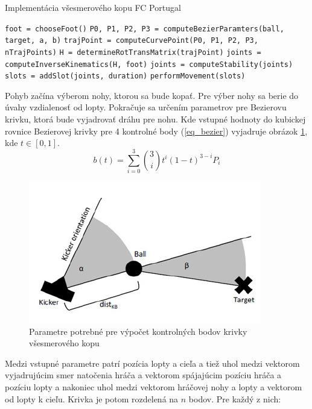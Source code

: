 \begin{algorithm}
	\caption{Implementácia všesmerového kopu FC Portugal}\label{} 
	\begin{algorithmic}
		\STATE \texttt{foot = chooseFoot()}
		\STATE \texttt{P0, P1, P2, P3 = computeBezierParamters(ball, target, a, b)}
			\STATE \texttt{trajPoint = computeCurvePoint(P0, P1, P2, P3, nTrajPoints)}
			\STATE \texttt{H = determineRotTransMatrix(trajPoint)}
			\STATE \texttt{joints = computeInverseKinematics(H, foot)}
			\STATE \texttt{joints = computeStability(joints)}
			\STATE \texttt{slots = addSlot(joints, duration)}
		\ENDFOR
		\STATE \texttt{performMovement(slots)}
	\end{algorithmic}
\end{algorithm}

Pohyb začína výberom nohy, ktorou sa bude kopať. Pre výber nohy sa berie do úvahy vzdialenosť od lopty. Pokračuje sa určením parametrov pre Bezierovu krivku, ktorá bude vyjadrovať dráhu pre nohu. Kde vstupné hodnoty do kubickej rovnice Bezierovej krivky pre 4 kontrolné body (\ref{eq_bezier}) vyjadruje obrázok \ref{pic_kick_arch_fc_portugal_params}, kde $t \in [0,1]$.
\begin{equation}\label{eq_bezier}
	b(t) = \sum_{i = 0}^{3}
	{
		{3 \choose i} t^i {(1 - t)}^{3 - i} P_i
	}
\end{equation}

\begin{figure}[H]
	\center
	\includegraphics[scale=1]{./data/kick_arch_fc_portugal_params}
	\caption{Parametre potrebné pre výpočet kontrolných bodov krivky všesmerového kopu \cite{fc_portugal}}
	\label{pic_kick_arch_fc_portugal_params}
\end{figure}

Medzi vstupné parametre patrí pozícia lopty a cieľa a tiež uhol medzi vektorom vyjadrujúcim smer natočenia hráča a vektorom spájajúcim pozíciu hráča a pozíciu lopty a nakoniec uhol medzi vektorom hráčovej nohy a lopty a vektorom od lopty k cieľu. Krivka je potom rozdelená na $n$ bodov. Pre každý z nich:

